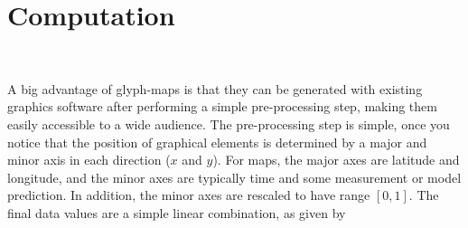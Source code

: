 \documentclass[oneside]{article}
\begin{document}






\section{Computation}~\label{sec:construction}

A big advantage of glyph-maps is that they can be generated with existing graphics software after performing a simple pre-processing step, making them easily accessible to a wide audience. The pre-processing step is simple, once you notice that the position of graphical elements is determined by a major and minor axis in each direction ($x$ and $y$). For maps, the major axes are latitude and longitude, and the minor axes are typically time and some measurement or model prediction. In addition, the minor axes are rescaled to have range $[0, 1]$. The final data values are a simple linear combination, as given by 
\end{document}
